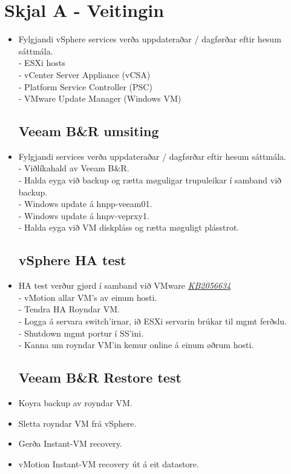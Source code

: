 \section{Skjal A - Veitingin}
\begin{itemize}

\subsection*{vSphere umsiting}
	\item Fylgjandi vSphere services verða uppdateraðar / dagførðar eftir hesum sáttmála. \\
	- ESXi hosts							\\
	- vCenter Server Appliance (vCSA)		\\
	- Platform Service Controller (PSC)		\\
	- VMware Update Manager (Windows VM)
	
\subsection*{Veeam B\&R umsiting}
	\item Fylgjandi services verða uppdateraðar / dagførðar eftir hesum sáttmála.	\\
	- Viðlíkahald av Veeam B\&R.		\\
	- Halda eyga við backup og rætta møguligar trupuleikar í samband við backup.	\\
	- Windows update á hnpp-veeam01.	\\
	- Windows update á hnpv-veprxy1.	\\
	- Halda eyga við VM diskpláss og rætta møguligt plásstrot.
	
\subsection*{vSphere HA test}
	\item HA test verður gjørd í samband við VMware \href{kb.vmware.com/kb/2056634}{\textit{KB2056634}}\\
	- vMotion allar VM's av einum hosti. \\
	- Tendra HA Royndar VM. \\
	- Logga á servara switch'irnar, ið ESXi servarin brúkar til mgmt ferðslu. \\
	- Shutdown mgmt portur í SS'ini. \\
	- Kanna um royndar VM'in kemur online á einum øðrum hosti.
	
\subsection*{Veeam B\&R Restore test}
	\item Koyra backup av royndar VM.
	\item Sletta royndar VM frá vSphere.
	\item Gerða Instant-VM recovery.
	\item vMotion Instant-VM recovery út á eit datastore.


\end{itemize}

